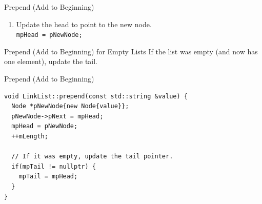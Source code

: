 \documentclass[14pt,aspectratio=1610, hyperref={pdfpagelayout=SinglePage}]{beamer}
\begin{document}
\begin{frame}{Prepend (Add to Beginning)}
\begin{enumerate}\addtocounter{enumi}{2}
\item
  Update the head to point to the new node.\\
  \lstinline{mpHead = pNewNode;}\\[1em]
\end{enumerate}

\end{frame}

\begin{frame}{Prepend (Add to Beginning) for Empty Lists}
    If the list was empty (and now has one element), update the tail.
  
  \end{frame}

\begin{frame}[fragile]{Prepend (Add to Beginning)}
\begin{lstlisting}[basicstyle=\small\ttfamily]
void LinkList::prepend(const std::string &value) {
  Node *pNewNode{new Node{value}};
  pNewNode->pNext = mpHead;
  mpHead = pNewNode;
  ++mLength;

  // If it was empty, update the tail pointer.
  if(mpTail != nullptr) {
    mpTail = mpHead;
  }
}
\end{lstlisting}
\end{frame}
\end{document}
